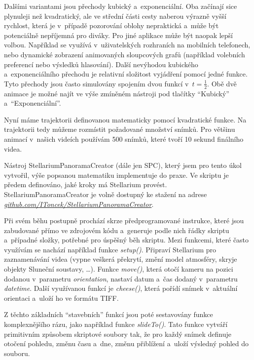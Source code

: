 \documentclass[12pt,a4paper,titlepage]{article}
\newcommand{\link}[2]{\href{#1}{\textcolor{link-color}{\textit{#2}}}}%
\begin{document}
Dalšími variantami jsou přechody kubický a~exponenciální. Oba začínají sice plynuleji než kvadratický, ale ve střední části cesty naberou výrazně vyšší rychlost, která je v~případě pozorování oblohy nepraktická a~může být potenciálně nepříjemná pro diváky. Pro jiné aplikace může být naopak lepší volbou. Například se využívá v~uživatelských rozhraních na mobilních telefonech, nebo dynamické zobrazení animovaných sloupcových grafů (například volebních preferencí nebo výsledků hlasování). Další nevýhodou kubického a~exponenciálního přechodu je relativní složitost vyjádření pomocí jedné funkce. Tyto přechody jsou často simulovány spojením dvou funkcí v~$t=\frac{1}{2}$. Obě dvě animace je možné najít ve výše zmíněném nástroji pod tlačítky \enquote{Kubický} a~\enquote{Exponenciální}.

Nyní máme trajektorii definovanou matematicky pomocí kvadratické funkce. Na trajektorii tedy můžeme rozmístit požadované množství snímků. Pro většinu animací v~našich videích používám 500 snímků, které tvoří 10 sekund finálního videa.

Nástroj StellariumPanoramaCreator (dále jen SPC), který jsem pro tento úkol vytvořil, výše popsanou matematiku implementuje do praxe. Ve skriptu je předem definováno, jaké kroky má Stellarium provést. StellariumPanoramaCreator je volně dostupný ke stažení na adrese \link{https://github.com/IToncek/StellariumPanoramaCreator}{github.com/IToncek/StellariumPanoramaCreator}. 

Při svém běhu postupně prochází skrze předprogramované instrukce, které jsou zabudované přímo ve zdrojovém kódu a~generuje podle nich řádky skriptu a~případné složky, potřebné pro úspěšný běh skriptu. Mezi funkcemi, které často využívám se nachází například funkce \textit{setup()}. Připraví Stellarium pro zaznamenávání videa (vypne veškerá překrytí, změní model atmosféry, skryje objekty Sluneční soustavy, \ldots). Funkce \textit{move()}, která otočí kameru na pozici dodanou v~parametru \textit{orientation}, nastaví datum a~čas dodaný v~parametru \textit{datetime}. Další využívanou funkcí je \textit{cheese()}, která pořídí snímek v~aktuální orientaci a~uloží ho ve formátu TIFF.%

Z těchto základních \enquote{stavebních} funkcí jsou poté sestavovány funkce komplexnějšího rázu, jako například funkce \textit{slideTo()}. Tato funkce vytváří primitivním způsobem skriptové soubory tak, že pro každý snímek definuje otočení pohledu, změnu času a~dne, změnu přiblížení a~uloží výsledný pohled do souboru. %
\end{document}
